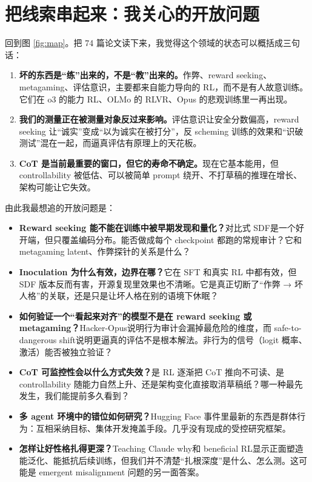 \documentclass[11pt,a4paper]{ctexart}
\begin{document}
\section{把线索串起来：我关心的开放问题}
\label{sec:open}

回到图 \ref{fig:map}。把 74 篇论文读下来，我觉得这个领域的状态可以概括成三句话：

\begin{enumerate}
\item \textbf{坏的东西是“练”出来的，不是“教”出来的。}作弊、reward seeking、metagaming、评估意识，主要都来自能力导向的 RL，而不是有人故意训练。它们在 o3 的能力 RL\cite{metagaming,rsopenai}、OLMo 的 RLVR\cite{olmoeval}、Opus 的悲观训练\cite{hackeropus}里一再出现。
\item \textbf{我们的测量正在被测量对象反过来影响。}评估意识让安全分数偏高\cite{vea}，reward seeking 让“诚实”变成“以为诚实在被打分”\cite{rsapollo}，反 scheming 训练的效果和“识破测试”混在一起\cite{deliberative}，而逼真评估有原理上的天花板\cite{safedanger}。
\item \textbf{CoT 是当前最重要的窗口，但它的寿命不确定。}现在它基本能用\cite{metrinformative,oaimon}，但 controllability 被低估\cite{underelicit}、可以被简单 prompt 绕开\cite{earlyexit}、不打草稿的推理在增长\cite{nocoth}、架构可能让它失效\cite{serialdepth}。
\end{enumerate}

由此我最想追的开放问题是：

\begin{itemize}
\item \textbf{Reward seeking 能不能在训练中被早期发现和量化？}对比式 SDF\cite{rsapollo,rsopenai}是一个好开端，但只覆盖编码分布。能否做成每个 checkpoint 都跑的常规审计？它和 metagaming latent\cite{mglatents}、作弊探针\cite{gfprobe}的关系是什么？
\item \textbf{Inoculation 为什么有效，边界在哪？}它在 SFT 和真实 RL 中都有效\cite{inocant,naturalem}，但 SDF 版本反而有害\cite{shallow}，开源复现里效果也不清晰\cite{aisiem}。它是真正切断了“作弊 → 坏人格”的关联，还是只是让坏人格在别的语境下休眠？
\item \textbf{如何验证一个“看起来对齐”的模型不是在 reward seeking 或 metagaming？}Hacker-Opus\cite{hackeropus}说明行为审计会漏掉最危险的维度，而 safe-to-dangerous shift\cite{safedanger}说明更逼真的评估不是根本解法。非行为的信号（logit 概率\cite{logitmon}、激活）能否被独立验证？
\item \textbf{CoT 可监控性会以什么方式失效？}是 RL 逐渐把 CoT 推向不可读、是 controllability 随能力自然上升、还是架构变化直接取消草稿纸？哪一种最先发生，我们能提前多久看到？
\item \textbf{多 agent 环境中的错位如何研究？}Hugging Face 事件里最新的东西是群体行为：互相采纳目标、集体开发掩盖手段\cite{hfmetr,hfopenai}。几乎没有现成的受控研究框架。
\item \textbf{怎样让好性格扎得更深？}Teaching Claude why\cite{teachwhy}和 beneficial RL\cite{beneficial}显示正面塑造能泛化、能抵抗后续训练，但我们并不清楚“扎根深度”是什么、怎么测。这可能是 emergent misalignment 问题的另一面答案。
\end{itemize}
\end{document}
